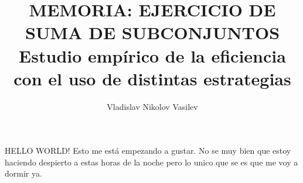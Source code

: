 \documentclass{article}
\title{
	MEMORIA: EJERCICIO DE SUMA DE SUBCONJUNTOS \\ %
	\large Estudio empírico de la eficiencia \\
	con el uso de distintas estrategias}
\author{Vladislav Nikolov Vasilev}
\begin{document}
  \maketitle			  %
  \newpage				  %
 HELLO WORLD!
  Esto me está empezando a gustar. No se muy bien que estoy haciendo despierto a estas horas de la noche pero lo unico que se es que me voy a dormir ya.
\end{document}
